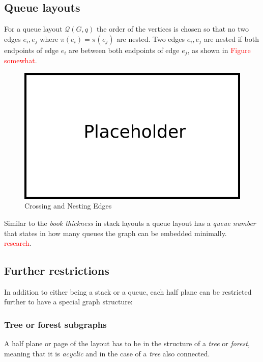 \subsection{Queue layouts}
For a queue layout $\mathcal{Q}(G,q)$ the order of the vertices is chosen so that no two edges $e_i, e_j$ where $\pi(e_i) = \pi(e_j)$ are nested. Two edges $e_i, e_j$ are nested if both endpoints of edge $e_i$ are between both endpoints of edge $e_j$, as shown in \textcolor{red}{Figure somewhat}.
\begin{figure}[!h]
\begin{center}
\includegraphics[width=1\textwidth]{figures/Platzhalter.png}
\caption{Crossing and Nesting Edges}
\label{img:plzhltr}
\end{center}
\end{figure}
Similar to the \textit{book thickness} in stack layouts a queue layout has a \textit{queue number} that states in how many queues the graph can be embedded minimally.\\
\textcolor{red}{research}.
\subsection{Further restrictions}
In addition to either being a stack or a queue, each half plane can be restricted further to have a special graph structure:
\subsubsection{Tree or forest subgraphs}
A half plane or page of the layout has to be in the structure of a \textit{tree} or \textit{forest}, meaning that it is \textit{acyclic} and in the case of a \textit{tree} also connected.

